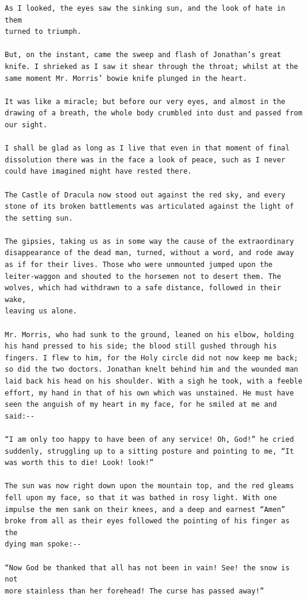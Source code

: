 \documentclass{article}
\begin{document}
\begin{verbatim}
As I looked, the eyes saw the sinking sun, and the look of hate in them
turned to triumph.

But, on the instant, came the sweep and flash of Jonathan’s great
knife. I shrieked as I saw it shear through the throat; whilst at the
same moment Mr. Morris’ bowie knife plunged in the heart.

It was like a miracle; but before our very eyes, and almost in the
drawing of a breath, the whole body crumbled into dust and passed from
our sight.

I shall be glad as long as I live that even in that moment of final
dissolution there was in the face a look of peace, such as I never
could have imagined might have rested there.

The Castle of Dracula now stood out against the red sky, and every
stone of its broken battlements was articulated against the light of
the setting sun.

The gipsies, taking us as in some way the cause of the extraordinary
disappearance of the dead man, turned, without a word, and rode away
as if for their lives. Those who were unmounted jumped upon the
leiter-waggon and shouted to the horsemen not to desert them. The
wolves, which had withdrawn to a safe distance, followed in their wake,
leaving us alone.

Mr. Morris, who had sunk to the ground, leaned on his elbow, holding
his hand pressed to his side; the blood still gushed through his
fingers. I flew to him, for the Holy circle did not now keep me back;
so did the two doctors. Jonathan knelt behind him and the wounded man
laid back his head on his shoulder. With a sigh he took, with a feeble
effort, my hand in that of his own which was unstained. He must have
seen the anguish of my heart in my face, for he smiled at me and
said:--

“I am only too happy to have been of any service! Oh, God!” he cried
suddenly, struggling up to a sitting posture and pointing to me, “It
was worth this to die! Look! look!”

The sun was now right down upon the mountain top, and the red gleams
fell upon my face, so that it was bathed in rosy light. With one
impulse the men sank on their knees, and a deep and earnest “Amen”
broke from all as their eyes followed the pointing of his finger as the
dying man spoke:--

“Now God be thanked that all has not been in vain! See! the snow is not
more stainless than her forehead! The curse has passed away!”


\end{verbatim}
\end{document}
